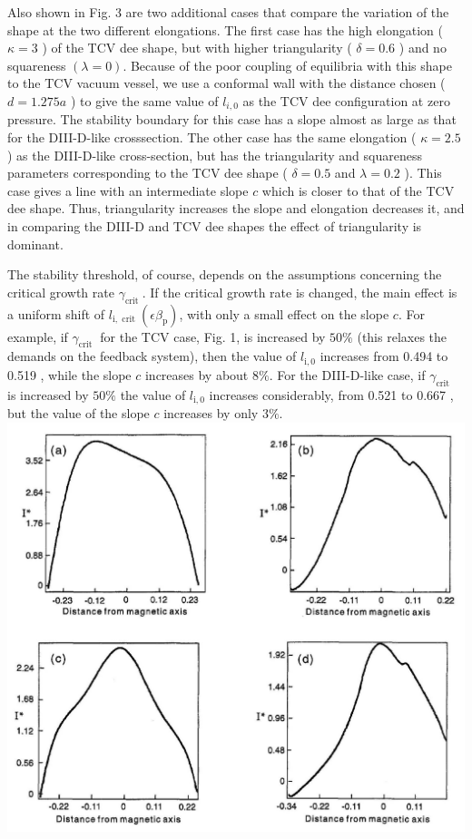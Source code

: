 \documentclass[10pt]{article}
\begin{document}
Also shown in Fig. 3 are two additional cases that compare the variation of the shape at the two different elongations. The first case has the high elongation ( $\kappa=3$ ) of the TCV dee shape, but with higher triangularity ( $\delta=0.6$ ) and no squareness $(\lambda=0)$. Because of the poor coupling of equilibria with this shape to the TCV vacuum vessel, we use a conformal wall with the distance chosen ( $d=1.275 a$ ) to give the same value of $l_{i, 0}$ as the TCV dee configuration at zero pressure. The stability boundary for this case has a slope almost as large as that for the DIII-D-like crosssection. The other case has the same elongation ( $\kappa=2.5$ ) as the DIII-D-like cross-section, but has the triangularity and squareness parameters corresponding to the TCV dee shape ( $\delta=0.5$ and $\lambda=0.2$ ). This case gives a line with an intermediate slope $c$ which is closer to that of the TCV dee shape. Thus, triangularity increases the slope and elongation decreases it, and in comparing the DIII-D and TCV dee shapes the effect of triangularity is dominant.

The stability threshold, of course, depends on the assumptions concerning the critical growth rate $\gamma_{\text {crit }}$. If the critical growth rate is changed, the main effect is a uniform shift of $l_{\mathrm{i}, \text { crit }}\left(\epsilon \beta_{\mathrm{p}}\right)$, with only a small effect on the slope $c$. For example, if $\gamma_{\text {crit }}$ for the TCV case, Fig. 1, is increased by $50 \%$ (this relaxes the demands on the feedback system), then the value of $l_{\mathrm{i}, 0}$ increases from 0.494 to 0.519 , while the slope $c$ increases by about $8 \%$. For the DIII-D-like case, if $\gamma_{\text {crit }}$ is increased by $50 \%$ the value of $l_{\mathrm{i}, 0}$ increases considerably, from 0.521 to 0.667 , but the value of the slope $c$ increases by only $3 \%$.\\
\includegraphics[max width=\textwidth, center]{2025_01_10_a0135324997886412d98g-4}
\end{document}
